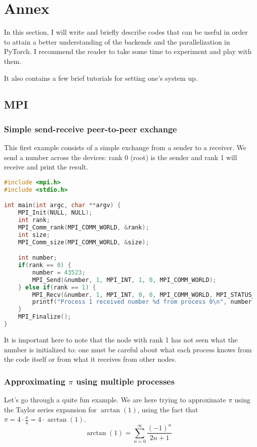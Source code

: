 \section{Annex}
In this section, I will write and briefly describe codes that can be useful in order to attain a better understanding of the backends and the parallelization in PyTorch. I recommend the reader to take some time to experiment and play with them.

It also contains a few brief tutorials for setting one's system up.

\subsection{MPI}
\subsubsection{Simple send-receive peer-to-peer exchange}
This first example consists of a simple exchange from a sender to a receiver. We send a number across the devices: rank 0 (root) is the sender and rank 1 will receive and print the result.

\begin{lstlisting}[language=C]
#include <mpi.h>
#include <stdio.h>

int main(int argc, char **argv) {
    MPI_Init(NULL, NULL);
    int rank;
    MPI_Comm_rank(MPI_COMM_WORLD, &rank);
    int size;
    MPI_Comm_size(MPI_COMM_WORLD, &size);

    int number;
    if(rank == 0) {
        number = 43523;
        MPI_Send(&number, 1, MPI_INT, 1, 0, MPI_COMM_WORLD);
    } else if(rank == 1) {
        MPI_Recv(&number, 1, MPI_INT, 0, 0, MPI_COMM_WORLD, MPI_STATUS_IGNORE);
        printf("Process 1 received number %d from process 0\n", number);
    }
    MPI_Finalize();
}
\end{lstlisting}

It is important here to note that the node with rank 1 has not seen what the number is initialized to: one must be careful about what each process knows from the code itself or from what it receives from other nodes.

\subsubsection{Approximating \texorpdfstring{$\pi$}{pi} using multiple processes}
Let's go through a quite fun example. We are here trying to approximate \(\pi\) using the Taylor series expansion for \(\arctan(1)\), using the fact that \(\pi=4\cdot \frac{\pi}{4}=4\cdot \arctan(1)\).
\[\arctan(1)=\sum_{n=0}^{\infty} \frac{(-1)^n}{2n+1}\]

